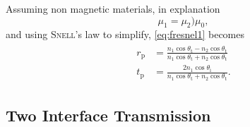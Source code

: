 \documentclass[../thesis.tex]{subfiles}
\begin{document}
        Assuming non magnetic materials, in explanation
        \begin{equation}
            \mu_1 = \mu_2 ) \mu_0,
        \end{equation}
        and using \textsc{Snell}'s law to simplify, \cref{eq:fresnel1} becomes
        \begin{align}
            \begin{split}
                r_\mathrm{p} &= \frac{n_1\cos\theta_\mathrm{t}-n_2\cos\theta_\mathrm{t}}{n_1\cos\theta_\mathrm{t}+n_2\cos\theta_\mathrm{t}}  \\
                t_\mathrm{p} &= \frac{2n_1\cos\theta_\mathrm{i}}{n_1\cos\theta_\mathrm{t}+n_2\cos\theta_\mathrm{t}}.
            \end{split}
            \label{eq:fresnel2}
        \end{align}

        


        \subsection{Two Interface Transmission}

            
\end{document}
